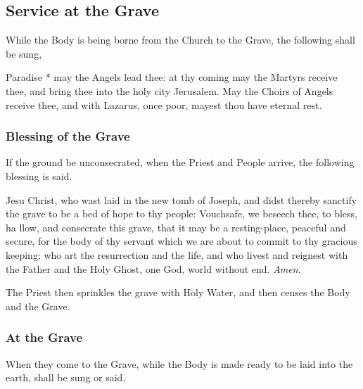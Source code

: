 \clearpage
\subsection{Service at the Grave}

\begin{rubric}
	While the Body is being borne from the Church to the Grave, the following shall be sung,
\end{rubric}

  Paradise * may the Angels lead thee: at thy coming may the Martyrs receive thee, and bring thee into the holy city Jerusalem. May the Choirs of Angels receive thee, and with Lazarus, once poor, mayest thou have eternal rest.

\subsubsection{Blessing of the Grave}
\begin{rubric}
    If the ground be unconsecrated, when the Priest and People arrive, the following blessing is said.
\end{rubric}
 Jesu Christ, who wast laid in the new tomb of Joseph, and didst thereby sanctify the grave to be a bed of hope to thy people: Vouchsafe, we beseech thee, to bless, ha {} llow, and consecrate this grave, that it may be a resting-place, peaceful and secure, for the body of thy servant which we are about to commit to thy gracious keeping; who art the resurrection and the life, and who livest and reignest with the Father and the Holy Ghost, one God, world without end. \textit{Amen.}
\begin{rubric}
    The Priest then sprinkles the grave with Holy Water, and then censes the Body and the Grave.
\end{rubric}

\subsubsection{At the Grave}
\begin{rubric}
    When they come to the Grave, while the Body is made ready to be laid into the earth, shall be sung or said,
\end{rubric}\par

